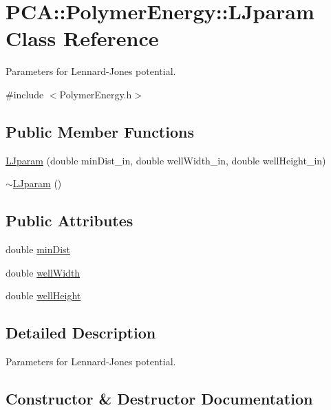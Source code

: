 \hypertarget{class_p_c_a_1_1_polymer_energy_1_1_l_jparam}{}\section{P\+CA\+:\+:Polymer\+Energy\+:\+:L\+Jparam Class Reference}
\label{class_p_c_a_1_1_polymer_energy_1_1_l_jparam}


Parameters for Lennard-\/\+Jones potential.  




{\ttfamily \#include $<$Polymer\+Energy.\+h$>$}

\subsection*{Public Member Functions}
\begin{DoxyCompactItemize}
\item 
\hyperlink{class_p_c_a_1_1_polymer_energy_1_1_l_jparam_ab5f247c5f6e2afa4bfebb367ab02b171}{L\+Jparam} (double min\+Dist\+\_\+in, double well\+Width\+\_\+in, double well\+Height\+\_\+in)
\item 
\hyperlink{class_p_c_a_1_1_polymer_energy_1_1_l_jparam_ad4eded4802535449a325849e19554169}{$\sim$\+L\+Jparam} ()
\end{DoxyCompactItemize}
\subsection*{Public Attributes}
\begin{DoxyCompactItemize}
\item 
double \hyperlink{class_p_c_a_1_1_polymer_energy_1_1_l_jparam_a9b9843259c0f7ec19d622dd4ee27c5a9}{min\+Dist}
\item 
double \hyperlink{class_p_c_a_1_1_polymer_energy_1_1_l_jparam_aa61682f506c151fc3171b8c10dd1e471}{well\+Width}
\item 
double \hyperlink{class_p_c_a_1_1_polymer_energy_1_1_l_jparam_a0c5a05f9a2c3950df60bfc8554e5421d}{well\+Height}
\end{DoxyCompactItemize}


\subsection{Detailed Description}
Parameters for Lennard-\/\+Jones potential. 

\subsection{Constructor \& Destructor Documentation}
\hypertarget{class_p_c_a_1_1_polymer_energy_1_1_l_jparam_ab5f247c5f6e2afa4bfebb367ab02b171}{}\label{class_p_c_a_1_1_polymer_energy_1_1_l_jparam_ab5f247c5f6e2afa4bfebb367ab02b171} 
